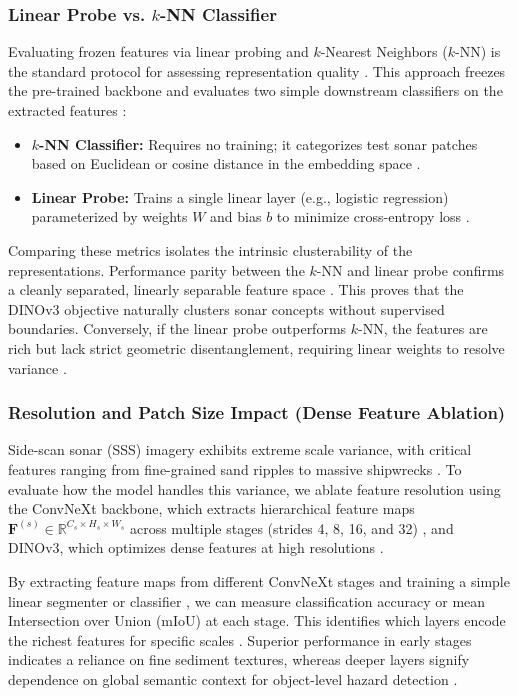 \documentclass[12pt]{article}
\begin{document}
\subsubsection{Linear Probe vs. $k$-NN Classifier}
Evaluating frozen features via linear probing and $k$-Nearest Neighbors ($k$-NN) is the standard protocol for assessing representation quality \cite{lee2023rethinking}. This approach freezes the pre-trained backbone and evaluates two simple downstream classifiers on the extracted features \cite{marks2024closer}:
\begin{itemize}
    \item \textbf{$k$-NN Classifier:} Requires no training; it categorizes test sonar patches based on Euclidean or cosine distance in the embedding space \cite{caron2021}.
    \item \textbf{Linear Probe:} Trains a single linear layer (e.g., logistic regression) parameterized by weights $W$ and bias $b$ to minimize cross-entropy loss \cite{lee2023rethinking}.
\end{itemize}

Comparing these metrics isolates the intrinsic clusterability of the representations. Performance parity between the $k$-NN and linear probe confirms a cleanly separated, linearly separable feature space \cite{caron2021, marks2024closer}. This proves that the DINOv3 objective naturally clusters sonar concepts without supervised boundaries. Conversely, if the linear probe outperforms $k$-NN, the features are rich but lack strict geometric disentanglement, requiring linear weights to resolve variance \cite{lee2023rethinking, marks2024closer}.

\subsubsection{Resolution and Patch Size Impact (Dense Feature Ablation)}
Side-scan sonar (SSS) imagery exhibits extreme scale variance, with critical features ranging from fine-grained sand ripples to massive shipwrecks \cite{can2025_sss, antoni2016}. To evaluate how the model handles this variance, we ablate feature resolution using the ConvNeXt backbone, which extracts hierarchical feature maps $\mathbf{F}^{(s)} \in \mathbb{R}^{C_s \times H_s \times W_s}$ across multiple stages (strides 4, 8, 16, and 32) \cite{liu2022}, and DINOv3, which optimizes dense features at high resolutions \cite{oriane2025}.

By extracting feature maps from different ConvNeXt stages and training a simple linear segmenter or classifier \cite{oquab2024}, we can measure classification accuracy or mean Intersection over Union (mIoU) at each stage. This identifies which layers encode the richest features for specific scales \cite{oriane2025, oquab2024}. Superior performance in early stages indicates a reliance on fine sediment textures, whereas deeper layers signify dependence on global semantic context for object-level hazard detection \cite{liu2022, can2025_physdnet}.
\end{document}
